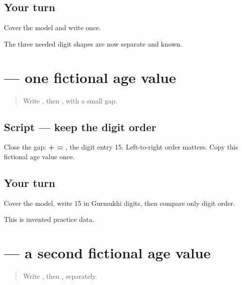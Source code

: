 \subsection*{Your turn}
Cover the model and write \textbf{} once.

\begin{tcolorbox}[breakable,colback=teal!4,colframe=teal!35!black,title={Before you move on}]
The three needed digit shapes are now separate and known.
\end{tcolorbox}
\section[\texorpdfstring{\pa{੧੫} (15)}{੧੫ (15)}]{ — one fictional age value}

\label{lesson:PA-W07-age-fifteen}



\begin{quote}
Write \textbf{}, then \textbf{}, with a small gap.
\end{quote}

\subsection*{Script — keep the digit order}
Close the gap: \textbf{ +  = }, the digit entry 15. Left-to-right order matters. Copy this fictional age value once.

\subsection*{Your turn}
Cover the model, write 15 in Gurmukhi digits, then compare only digit order.

\begin{tcolorbox}[breakable,colback=teal!4,colframe=teal!35!black,title={Before you move on}]
This is invented practice data.
\end{tcolorbox}
\section[\texorpdfstring{\pa{੨੫} (25)}{੨੫ (25)}]{ — a second fictional age value}

\label{lesson:PA-W07-age-twenty-five}



\begin{quote}
Write \textbf{}, then \textbf{}, separately.
\end{quote}

